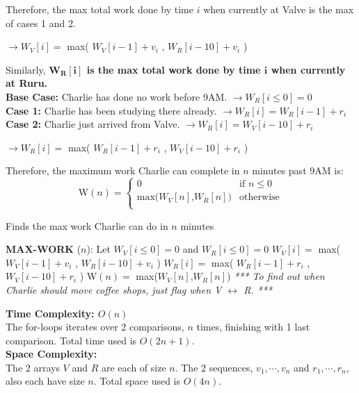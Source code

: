 \documentclass[11pt]{article}
\theoremstyle{definition}
\theoremstyle{plain}
\theoremstyle{indented-remark}
\theoremstyle{indented-proof}
\begin{document}
\indent Therefore, the max total work done by time $i$ when currently at Valve is the max of cases 1 and 2.
\begin{center}
$\longrightarrow W_{V}[i]=$ max( $W_{V}[i-1]+v_{i}$ , $W_{R}[i-10]+v_{i}$ )
\end{center}

\noindent Similarly, \textbf{$\boldsymbol{W_{R}[i]}$ is the max total work done by time $\boldsymbol{i}$ when currently at Ruru.} \\

\indent \textbf{Base Case:} Charlie has done no work before 9AM. $\longrightarrow W_{R}[i \leq 0] =0$ \\

\indent \textbf{Case 1:} Charlie has been studying there already. $\longrightarrow W_{R}[i]=W_{R}[i-1]+r_{i}$ \\

\indent \textbf{Case 2:} Charlie just arrived from Valve. $\longrightarrow W_{R}[i]=W_{V}[i-10]+r_{i}$

\begin{center}
$\longrightarrow W_{R}[i]=$ max( $W_{R}[i-1]+r_{i}$ , $W_{V}[i-10]+r_{i}$ )
\end{center}

\pagebreak

\noindent Therefore, the maximum work Charlie can complete in $n$ minutes past 9AM is:
\[
\text{W}(n) =
\begin{cases}
0 & \text{if $n \leq 0$}\\
\text{max($W_{V}[n]$,$W_{R}[n]$)}  & \text{otherwise}\\
\end{cases}       
\]

\begin{algorithm}
\caption{Finds the max work Charlie can do in $n$ minutes}
\begin{algorithmic} 
\STATE \textbf{MAX-WORK} ($n$):
\STATE Let $W_{V}[i \leq 0]=0$ and $W_{R}[i \leq 0]=0$
\STATE $W_{V}[i]=$ max( $W_{V}[i-1]+v_{i}$ , $W_{R}[i-10]+v_{i}$ )
\STATE $W_{R}[i]=$ max( $W_{R}[i-1]+r_{i}$ , $W_{V}[i-10]+r_{i}$ )
\ENDFOR
\STATE W$(n)=$ max($W_{V}[n]$,$W_{R}[n]$)
\STATE
\STATE \textit{*** To find out when Charlie should move coffee shops, just flag when V $\leftrightarrow$ R. ***}
\end{algorithmic}
\end{algorithm}

\noindent \textbf{Time Complexity: $O(n)$} \\
\noindent The for-loops iterates over 2 comparisons, $n$ times, finishing with 1 last comparison. Total time used is $O(2n+1)$.\\

\noindent \textbf{Space Complexity:} \\
\noindent The 2 arrays $V$ and $R$ are each of size $n$. The 2 sequences, {$v_{1}, \cdots , v_{n}$} and {$r_{1}, \cdots , r_{n}$}, also each have size $n$. Total space used is $O(4n)$.
\end{document}
